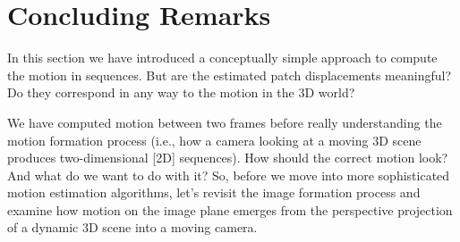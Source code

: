 


\section{Concluding Remarks}

In this section we have introduced a conceptually simple approach to compute the motion in sequences. But are the estimated patch displacements meaningful? Do they correspond in any way to the motion in the 3D world? 

We have computed motion between two frames before really understanding the motion formation process (i.e., how a camera looking at a moving 3D scene produces two-dimensional [2D] sequences). How should the correct motion look? And what do we want to do with it?
So, before we move into more sophisticated motion estimation algorithms, let's revisit the image formation process and examine how motion on the image plane emerges from the perspective projection of a dynamic 3D scene into a moving camera. 
